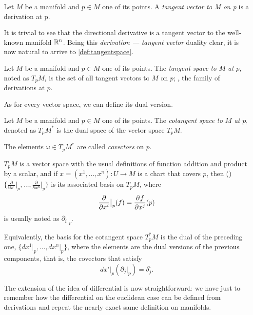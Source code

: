 \begin{definition}
	\label{def:tangentvector}
	Let $M$ be a manifold and $p \in M$ one of its points. A \emph{tangent vector to M on p} is a derivation at p.
\end{definition}

It is trivial to see that the directional derivative is a tangent vector to the well-known manifold $\mathbb{R}^n$. Being this \emph{derivation --- tangent vector} duality clear, it is now natural to arrive to \autoref{def:tangentspace}.

\begin{definition}
	\label{def:tangentspace}
	Let $M$ be a manifold and $p \in M$ one of its points. The \emph{tangent space to $M$ at $p$}, noted as $T_p M$, is the set of all tangent vectors to $M$ on $p$; \ie, the family of derivations at $p$.
\end{definition}

As for every vector space, we can define its dual version.
\begin{definition}
	Let $M$ be a manifold and $p \in M$ one of its points. The \emph{cotangent space to $M$ at $p$}, denoted as $T_p M^*$ is the dual space of the vector space $T_p M$.
	
	The elements $\omega \in T_p M^*$ are called \emph{covectors} on $p$.
\end{definition}

\begin{remark}
	\label{rem:derivedbases}
	$T_p M$ is a vector space with the usual definitions of function addition and product by a scalar, and if $x = (x^1, \dots, x^n) \colon U \to M$ is a chart that covers $p$, then (\cite[p. 8]{docarmo79}) $\{ \frac{\partial}{\partial x^1}\bigr|_p, \dots, \frac{\partial}{\partial x^n}\bigr|_p\}$ is its associated basis on $T_p M$, where
	\[
	\frac{\partial}{\partial x^i}\bigr|_p (f) = \frac{\partial^{} f}{\partial x^j}(p)
	\]
	is usually noted as $\partial_i \bigr|_p$.
	
	Equivalently, the basis for the cotangent space $T_p^* M$ is the dual of the preceding one, $\{dx^1\bigr|_p, \dots, dx^n\bigr|_p\}$, where the elements are the dual versions of the previous components, that is, the covectors that satisfy
	\[
		dx^i\bigr|_p\left(\partial_j \bigr|_p\right) = \delta^i_j.
	\]
\end{remark}

The extension of the idea of differential is now straightforward: we have just to remember how the differential on the euclidean case can be defined from derivations and repeat the nearly exact same definition on manifolds.

